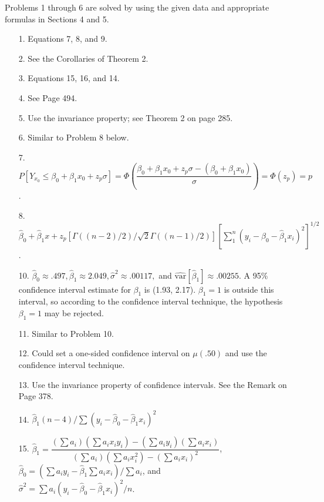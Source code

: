 Problems 1 through 6 are solved by using the given data and appropriate formulas in Sections 4 and 5.
\begin{enumerate}
	\item[1.] Equations 7, 8, and 9.
	
	\item[2.] See the Corollaries of Theorem 2.
	
	\item[3.] Equations 15, 16, and 14.
	
	\item[4.] See Page 494.
	
	\item[5.] Use the invariance property; see Theorem 2 on page 285.
	
	\item[6.] Similar to Problem 8 below.
	
	\item[7.] $P[Y_{x_0}\le \beta_0 + \beta_1x_0 + z_p\sigma] = \Phi\left(\dfrac{\beta_0+\beta_1x_0+z_p\sigma -(\beta_0+\beta_1x_0)}{\sigma}\right) = \Phi(z_p) = p$.
	
	\item[8.] $\hat{\beta}_0 + \hat{\beta}_1x + z_p[\Gamma((n-2)/2)/\sqrt{2}\Gamma((n-1)/2)][\sum\limits_{1}^{n}(y_i-\hat{\beta}_0-\hat{\beta}_1x_i)^2]^{1/2}$.
	
	\item[10.] $\hat{\beta}_0\approx .497, \hat{\beta}_1\approx 2.049, \hat{\sigma}^2\approx .00117,$ and $\hat{\mbox{var}}[\hat{\beta}_1]\approx .00255.$ A 95\% confidence interval estimate for $\beta_1$ is (1.93, 2.17). $\beta_1=1$ is outside this interval, so according to the confidence interval technique, the hypothesis $\beta_1=1$ may be rejected.
	
	\item[11.] Similar to Problem 10. 

	\item[12.] Could set a one-sided confidence interval on $\mu(.50)$ and use the confidence interval technique.
	
	\item[13.] Use the invariance property of confidence intervals. See the Remark on Page 378.

	\item[14.] $\hat{\beta}_1(n-4)/\sum(y_i-\hat{\beta}_0-\hat{\beta}_1x_i)^2$

	\item[15.] $\hat{\beta}_1 = \dfrac{(\sum a_i)(\sum a_ix_iy_i) -(\sum a_iy_i)(\sum a_ix_i)}{(\sum a_i)(\sum a_ix_i^2) - (\sum a_ix_i)^2}$, \\
	$\hat{\beta}_0 = (\sum a_iy_i - \hat{\beta}_1\sum a_ix_i)/\sum a_i$, and \\
	$\hat{\sigma}^2 = \sum a_i(y_i-\hat{\beta}_0-\hat{\beta}_1x_i)^2/n$.


\end{enumerate}
